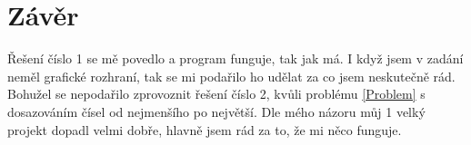 \chapter{Závěr}
Řešení číslo 1 se mě povedlo a program funguje, tak jak má. I když jsem v zadání neměl grafické rozhraní, tak se mi podařilo ho udělat za co jsem neskutečně rád. Bohužel se nepodařilo zprovoznit řešení číslo 2, kvůli problému \ref{Problem} s dosazováním čísel od nejmenšího po největší. Dle mého názoru můj 1 velký projekt dopadl velmi dobře, hlavně jsem rád za to, že mi něco funguje.
